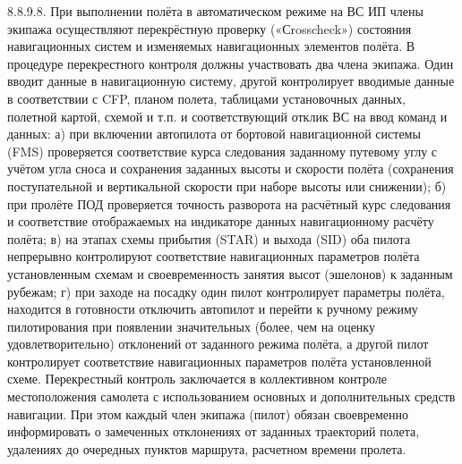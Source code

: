 8.8.9.8. При выполнении полёта в автоматическом режиме на ВС ИП члены экипажа осуществляют перекрёстную проверку («Сrosscheck») состояния навигационных систем и изменяемых навигационных элементов полёта. В процедуре перекрестного контроля должны участвовать два члена экипажа. Один вводит данные в навигационную систему, другой контролирует вводимые данные в соответствии с CFP, планом полета, таблицами установочных данных, полетной картой, схемой и т.п. и соответствующий отклик ВС на ввод команд и данных:
а)	при включении автопилота от бортовой навигационной системы (FMS) проверяется соответствие курса следования заданному путевому углу с учётом угла сноса и сохранения заданных высоты и скорости полёта (сохранения поступательной и вертикальной скорости при наборе высоты или снижении);
б)	при пролёте ПОД проверяется точность разворота на расчётный курс следования и соответствие отображаемых на индикаторе данных навигационному расчёту полёта;
в)	на этапах схемы прибытия (STAR) и выхода (SID) оба пилота непрерывно контролируют соответствие навигационных параметров полёта установленным схемам и своевременность занятия высот (эшелонов) к заданным рубежам;
г)	при заходе на посадку один пилот контролирует параметры полёта, находится в готовности отключить автопилот и перейти к ручному режиму пилотирования при появлении значительных (более, чем на оценку удовлетворительно) отклонений от заданного режима полёта, а другой пилот контролирует соответствие навигационных параметров полёта установленной схеме.
Перекрестный контроль заключается в коллективном контроле местоположения самолета с использованием основных и дополнительных средств навигации. При этом каждый член экипажа (пилот) обязан своевременно информировать о замеченных отклонениях от заданных траекторий полета, удалениях до очередных пунктов маршрута, расчетном времени пролета.
